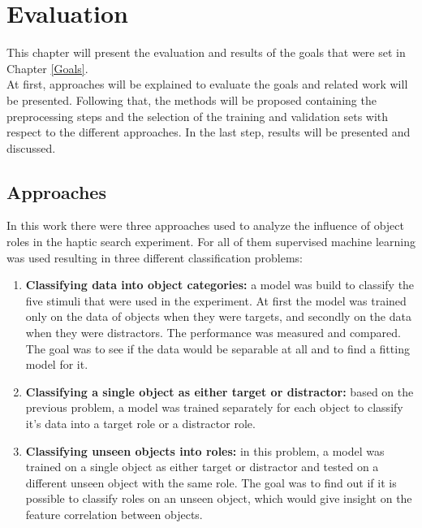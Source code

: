 
\chapter{Evaluation} %

\label{Evaluation} %
This chapter will present the evaluation and results of the goals that were set in Chapter \ref{Goals}.\\
At first, approaches will be explained to evaluate the goals and related work will be presented. Following that, the methods will be proposed containing the preprocessing steps and the selection of the training and validation sets with respect to the different approaches. In the last step, results will be presented and discussed.


\section{Approaches} \label{approaches}
In this work there were three approaches used to analyze the influence of object roles in the haptic search experiment. For all of them supervised machine learning was used resulting in three different classification problems: \\
\begin{enumerate}
	\item \textbf{Classifying data into object categories:} a model was build to classify the five stimuli that were used in the experiment. At first the model was trained only on the data of objects when they were targets, and secondly on the data when they were distractors. The performance was measured and compared. The goal was to see if the data would be separable at all and to find a fitting model for it.
	
	\item \textbf{Classifying a single object as either target or distractor:} based on the previous problem, a model was trained separately for each object to classify it's data into a target role or a distractor role. 
	
	\item \textbf{Classifying unseen objects into roles:} in this problem, a model was trained on a single object as either target or distractor and tested on a different unseen object with the same role. The goal was to find out if it is possible to classify roles on an unseen object, which would give insight on the feature correlation between objects.       
\end{enumerate}

